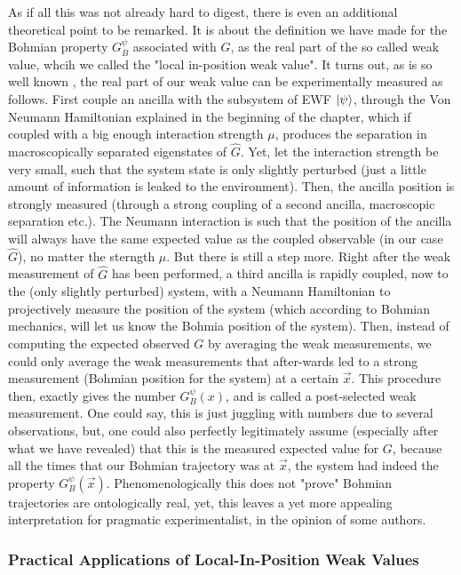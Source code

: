 \documentclass[11pt, a4paper]{article} %
\begin{document}
As if all this was not already hard to digest, there is even an additional theoretical point to be remarked. It is about the definition we have made for the Bohmian property $G_B^\psi$ associated with $G$, as the real part of the so called weak value, whcih we called the "local in-position weak value". It turns out, as is so well known \cite{Weak}, the real part of our weak value can be experimentally measured as follows. First couple an ancilla with the subsystem of EWF $\ket{\psi}$, through the Von Neumann Hamiltonian explained in the beginning of the chapter, which if coupled with a big enough interaction strength $\mu$, produces the separation in macroscopically separated eigenstates of $\hat{G}$. Yet, let the interaction strength be very small, such that the system state is only slightly perturbed (just a little amount of information is leaked to the environment). Then, the ancilla position is strongly measured (through a strong coupling of a second ancilla, macroscopic separation etc.). The Neumann interaction is such that the position of the ancilla will always have the same expected value as the coupled observable (in our case $\hat{G}$), no matter the sterngth $\mu$. But there is still a step more. Right after the weak measurement of $\hat{G}$ has been performed, a third ancilla is rapidly coupled, now to the (only slightly perturbed) system, with a Neumann Hamiltonian to projectively measure the position of the system (which according to Bohmian mechanics, will let us know the Bohmia position of the system). Then, instead of computing the expected observed $G$ by averaging the weak measurements, we could only average the weak measurements that after-wards led to a strong measurement (Bohmian position for the system) at a certain $\vec{x}$. This procedure then, exactly gives the number $G^\psi_B(x)$, and is called a post-selected weak measurement. One could say, this is just juggling with numbers due to several observations, but, one could also perfectly legitimately assume (especially after what we have revealed) that this is the measured expected value for $G$, because all the times that our Bohmian trajectory was at $\vec{x}$, the system had indeed the property $G^\psi_B(\vec{x})$. Phenomenologically this does not "prove" Bohmian trajectories are ontologically real, yet, this leaves a yet more appealing interpretation for pragmatic experimentalist, in the opinion of some authors.

\subsubsection*{Practical Applications of Local-In-Position Weak Values}
\end{document}

